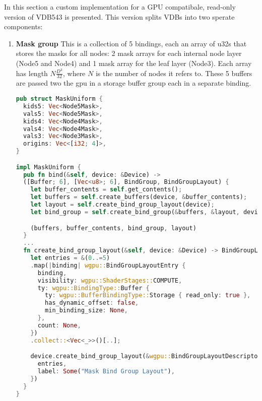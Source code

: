 In this section a custom implementation for a GPU compatibale, read-only version of VDB543 is presented. This version splits VDBs into two sperate components:
\begin{enumerate}
  \item\textbf{Mask group} This is a collection of 5 bindings, each an array of u32s that stores the masks for all nodes: 2 mask arrays for each internal node layer (Node5 and Node4) and 1 mask array for the leaf layer (Node3). Each array has length $N\frac{D^{3}}{32}$, where $N$ is the number of nodes it refers to. These 5 buffers are passed two the gpu in a storage buffer group each in a separate binding.

\begin{lstlisting}[language=rust, captionpos=b, caption={
    \texttt{MaskUniform} defintion: Each type of mask list is a separate binding. And additional binding created to store the origins of the top leval Node5 nodes.
    \texttt{MaskUniform} implementation: The \texttt{bind} method generates all data needed to pass the mask group to compute shaders. The \texttt{create\_bind\_group\_layout}
    function is the crtical part of this process, each binding is a storage buffer type with read-only access.
}]
pub struct MaskUniform {
  kids5: Vec<Node5Mask>,
  vals5: Vec<Node5Mask>,
  kids4: Vec<Node4Mask>,
  vals4: Vec<Node4Mask>,
  vals3: Vec<Node3Mask>,
  origins: Vec<[i32; 4]>,
}

impl MaskUniform {
  pub fn bind(&self, device: &Device) ->
  ([Buffer; 6], [Vec<u8>; 6], BindGroup, BindGroupLayout) {
    let buffer_contents = self.get_contents();
    let buffers = self.create_buffers(device, &buffer_contents);
    let layout = self.create_bind_group_layout(device);
    let bind_group = self.create_bind_group(&buffers, &layout, device);

    (buffers, buffer_contents, bind_group, layout)
  }
  ...
  fn create_bind_group_layout(&self, device: &Device) -> BindGroupLayout {
    let entries = &(0..=5)
    .map(|binding| wgpu::BindGroupLayoutEntry {
      binding,
      visibility: wgpu::ShaderStages::COMPUTE,
      ty: wgpu::BindingType::Buffer {
        ty: wgpu::BufferBindingType::Storage { read_only: true },
        has_dynamic_offset: false,
        min_binding_size: None,
      },
      count: None,
    })
    .collect::<Vec<_>>()[..];

    device.create_bind_group_layout(&wgpu::BindGroupLayoutDescriptor {
      entries,
      label: Some("Mask Bind Group Layout"),
    })
  }
}
\end{lstlisting}


\end{enumerate}
